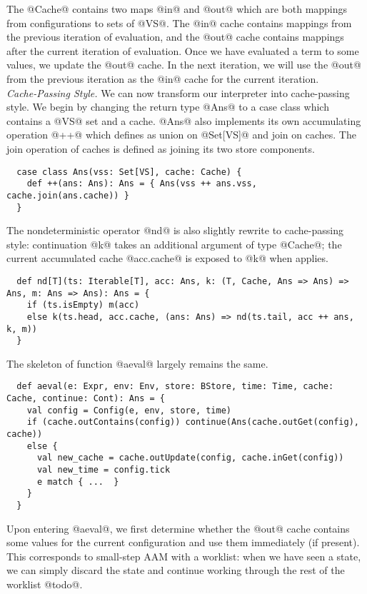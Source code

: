 \documentclass[acmsmall, review]{acmart}\settopmatter{}
\begin{document}
The @Cache@ contains two maps @in@ and @out@ which are both mappings from configurations 
to sets of @VS@. The @in@ cache contains mappings from the previous iteration of evaluation, 
and the @out@ cache contains mappings after the current iteration of evaluation. 
Once we have evaluated a term to some values, we update the @out@ cache. In the next 
iteration, we will use the @out@ from the previous iteration as the @in@ cache for the 
current iteration. \\

\textit{Cache-Passing Style.}
We can now transform our interpreter into cache-passing style. We begin by changing the 
return type @Ans@ to a case class which contains a @VS@ set and a cache. @Ans@ also implements 
its own accumulating operation @++@ which defines as union on @Set[VS]@ and join on caches.
The join operation of caches is defined as joining its two store components.

\begin{lstlisting}
  case class Ans(vss: Set[VS], cache: Cache) {
    def ++(ans: Ans): Ans = { Ans(vss ++ ans.vss, cache.join(ans.cache)) }
  }
\end{lstlisting}

The nondeterministic operator @nd@ is also slightly rewrite to cache-passing style:
continuation @k@ takes an additional argument of type @Cache@; the current accumulated
cache @acc.cache@ is exposed to @k@ when applies.

\begin{lstlisting}
  def nd[T](ts: Iterable[T], acc: Ans, k: (T, Cache, Ans => Ans) => Ans, m: Ans => Ans): Ans = {
    if (ts.isEmpty) m(acc)
    else k(ts.head, acc.cache, (ans: Ans) => nd(ts.tail, acc ++ ans, k, m))
  }
\end{lstlisting}

The skeleton of function @aeval@ largely remains the same. 

\begin{lstlisting}
  def aeval(e: Expr, env: Env, store: BStore, time: Time, cache: Cache, continue: Cont): Ans = {
    val config = Config(e, env, store, time)
    if (cache.outContains(config)) continue(Ans(cache.outGet(config), cache))
    else {
      val new_cache = cache.outUpdate(config, cache.inGet(config))
      val new_time = config.tick 
      e match { ...  }
    }
  }
\end{lstlisting}

Upon entering @aeval@, we first determine whether the @out@ cache
contains some values for the current configuration and use them immediately (if present).
This corresponds to small-step AAM with a worklist: when we have seen a state,
we can simply discard the state and continue working through the rest of the worklist @todo@.
\end{document}
